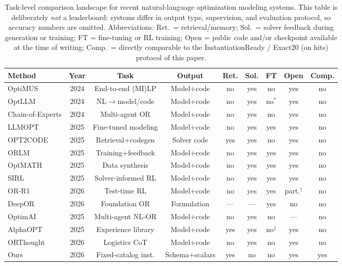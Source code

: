 \documentclass[pdflatex,sn-basic,Numbered]{sn-jnl}
\begin{document}
\begin{table}[t]
\centering
\caption{Task-level comparison landscape for recent natural-language optimization modeling systems.
This table is deliberately \emph{not} a leaderboard: systems differ in output type, supervision, and
evaluation protocol, so accuracy numbers are omitted. Abbreviations: Ret.\ = retrieval/memory;
Sol.\ = solver feedback during generation or training; FT = fine-tuning or RL training;
Open = public code and/or checkpoint available at the time of writing; Comp.\ = directly comparable
to the InstantiationReady / Exact20 (on hits) protocol of this paper.}
\label{tab:comparison_landscape}
\scriptsize
\setlength{\tabcolsep}{2.4pt}
\renewcommand{\arraystretch}{1.12}
\begin{tabular}{@{}lcccccccc@{}}
\toprule
Method & Year & Task & Output & Ret. & Sol. & FT & Open & Comp. \\
\midrule
OptiMUS & 2024 & End-to-end (MI)LP & Model+code & no & yes & no & yes & no \\
OptLLM & 2024 & NL$\rightarrow$model/code & Model+code & no & yes & no$^{*}$ & yes & no \\
Chain-of-Experts & 2024 & Multi-agent OR & Model+code & no & yes & no & yes & no \\
LLMOPT & 2025 & Fine-tuned modeling & Model+code & no & yes & yes & yes & no \\
OPT2CODE & 2025 & Retrieval+codegen & Solver code & yes & yes & no & yes & no \\
ORLM & 2025 & Training+feedback & Model+code & no & yes & yes & yes & no \\
OptMATH & 2025 & Data synthesis & Model+code & no & yes & yes & yes & no \\
SIRL & 2025 & Solver-informed RL & Model+code & no & yes & yes & yes & no \\
OR-R1 & 2026 & Test-time RL & Model+code & no & yes & yes & part.$^{\dagger}$ & no \\
DeepOR & 2026 & Foundation OR & Formulation & --- & --- & yes & no & no \\
OptimAI & 2025 & Multi-agent NL-OR & Model+code & no & yes & no & --- & no \\
AlphaOPT & 2025 & Experience library & Model+code & yes & yes & no$^{\ddagger}$ & yes & no \\
ORThought & 2026 & Logistics CoT & Model+code & no & yes & no & yes & no \\
Ours & 2026 & Fixed-catalog inst. & Schema+scalars & yes & no & no & yes & yes \\
\bottomrule
\end{tabular}


\end{table}
\end{document}
